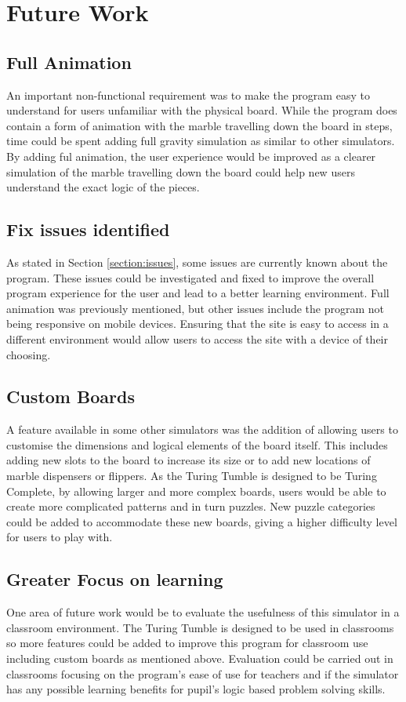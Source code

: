 \documentclass{l4proj}
\begin{document}
\section{Future Work}
\subsection{Full Animation}
An important non-functional requirement was to make the program easy to understand for users unfamiliar with the physical board. While the program does contain a form of animation with the marble travelling down the board in steps, time could be spent adding full gravity simulation as similar to other simulators. By adding ful animation, the user experience would be improved as a clearer simulation of the marble travelling down the board could help new users understand the exact logic of the pieces.

\subsection{Fix issues identified}
As stated in Section \ref{section:issues}, some issues are currently known about the program. These issues could be investigated and fixed to improve the overall program experience for the user and lead to a better learning environment. Full animation was previously mentioned, but other issues include the program not being responsive on mobile devices. Ensuring that the site is easy to access in a different environment would allow users to access the site with a device of their choosing.

\subsection{Custom Boards}
A feature available in some other simulators was the addition of allowing users to customise the dimensions and logical elements of the board itself. This includes adding new slots to the board to increase its size or to add new locations of marble dispensers or flippers. As the Turing Tumble is designed to be Turing Complete, by allowing larger and more complex boards, users would be able to create more complicated patterns and in turn puzzles. New puzzle categories could be added to accommodate these new boards, giving a higher difficulty level for users to play with.  

\subsection{Greater Focus on learning}
One area of future work would be to evaluate the usefulness of this simulator in a classroom environment. The Turing Tumble is designed to be used in classrooms so more features could be added to improve this program for classroom use including custom boards as mentioned above. Evaluation could be carried out in classrooms focusing on the program's ease of use for teachers and if the simulator has any possible learning benefits for pupil's logic based problem solving skills. 
\end{document}
